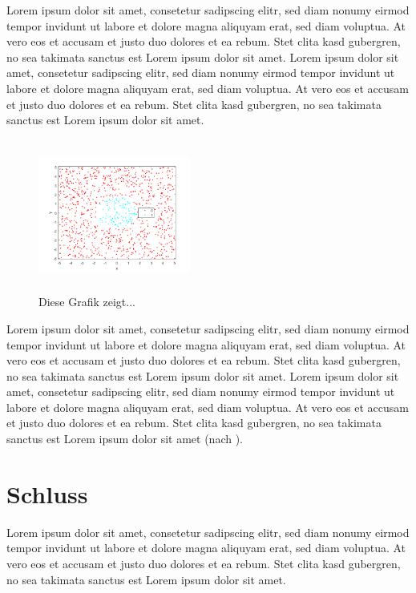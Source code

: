 \documentclass[12pt]{scrartcl}
\begin{document}
Lorem ipsum dolor sit amet, consetetur sadipscing elitr, sed diam nonumy eirmod tempor invidunt ut labore et dolore magna aliquyam erat, sed diam voluptua. At vero eos et accusam et justo duo dolores et ea rebum. Stet clita kasd gubergren, no sea takimata sanctus est Lorem ipsum dolor sit amet. Lorem ipsum dolor sit amet, consetetur sadipscing elitr, sed diam nonumy eirmod tempor invidunt ut labore et dolore magna aliquyam erat, sed diam voluptua. At vero eos et accusam et justo duo dolores et ea rebum. Stet clita kasd gubergren, no sea takimata sanctus est Lorem ipsum dolor sit amet.


\begin{figure}[h]
	\centering
	\includegraphics[width=5cm, height=5cm]{figures/scatter.png}
	\caption{Diese Grafik zeigt...}
\end{figure}

Lorem ipsum dolor sit amet, consetetur sadipscing elitr, sed diam nonumy eirmod tempor invidunt ut labore et dolore magna aliquyam erat, sed diam voluptua. At vero eos et accusam et justo duo dolores et ea rebum. Stet clita kasd gubergren, no sea takimata sanctus est Lorem ipsum dolor sit amet. Lorem ipsum dolor sit amet, consetetur sadipscing elitr, sed diam nonumy eirmod tempor invidunt ut labore et dolore magna aliquyam erat, sed diam voluptua. At vero eos et accusam et justo duo dolores et ea rebum. Stet clita kasd gubergren, no sea takimata sanctus est Lorem ipsum dolor sit amet (nach \cite{Russell.2018}).


\newpage








\section{Schluss}

Lorem ipsum dolor sit amet, consetetur sadipscing elitr, sed diam nonumy eirmod tempor invidunt ut labore et dolore magna aliquyam erat, sed diam voluptua. At vero eos et accusam et justo duo dolores et ea rebum. Stet clita kasd gubergren, no sea takimata sanctus est Lorem ipsum dolor sit amet.
\end{document}
